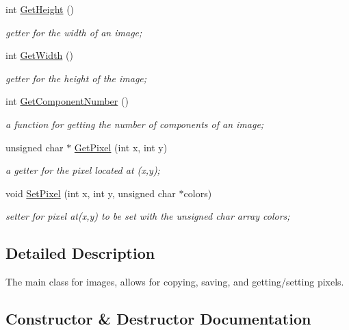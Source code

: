 \begin{DoxyCompactItemize}
int \hyperlink{classImage_a4d6de643ee334ff52c85da9a62d9297d}{Get\+Height} ()
\begin{DoxyCompactList}\small\item\em getter for the width of an image; \end{DoxyCompactList}\item 
int \hyperlink{classImage_a4ab80d76fd124fd9de9b4fca8ae16186}{Get\+Width} ()
\begin{DoxyCompactList}\small\item\em getter for the height of the image; \end{DoxyCompactList}\item 
int \hyperlink{classImage_a34d2edb4e483b17babd5f0026f7c2ab0}{Get\+Component\+Number} ()
\begin{DoxyCompactList}\small\item\em a function for getting the number of components of an image; \end{DoxyCompactList}\item 
unsigned char $\ast$ \hyperlink{classImage_aa0b312879805efe9b0bf50929383026d}{Get\+Pixel} (int x, int y)
\begin{DoxyCompactList}\small\item\em a getter for the pixel located at (x,y); \end{DoxyCompactList}\item 
void \hyperlink{classImage_a70147670b58d1b095e5c38b1f8bfb2db}{Set\+Pixel} (int x, int y, unsigned char $\ast$colors)
\begin{DoxyCompactList}\small\item\em setter for pixel at(x,y) to be set with the unsigned char array colors; \end{DoxyCompactList}\end{DoxyCompactItemize}


\subsection{Detailed Description}
The main class for images, allows for copying, saving, and getting/setting pixels. 

\subsection{Constructor \& Destructor Documentation}
\mbox{\label{classImage_a58edd1c45b4faeb5f789b0d036d02313}} 
